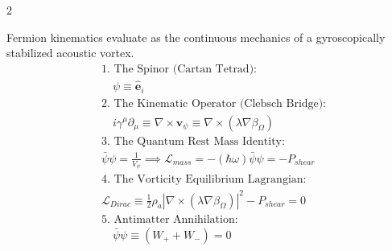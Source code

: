 \begin{multicols}{2}
\begin{tcolorbox}[cheatbox, title={\refstepcounter{cheatnum}\label{box:dirac_isomorphism}\thecheatnum. Vorticity Equilibrium (Dirac Isomorphism) \scriptsize\hfill\hyperref[sec:deriv_dirac_isomorphism]{[Proof $\downarrow$]}}]
Fermion kinematics evaluate as the continuous mechanics of a gyroscopically stabilized acoustic vortex.
\begin{align}
    &\text{1. The Spinor (Cartan Tetrad):} \nonumber \\
    &\quad \psi \equiv \mathbf{\hat{e}}_i \label{eq:spinor_identity} \\
    &\text{2. The Kinematic Operator (Clebsch Bridge):} \nonumber \\
    &\quad i\gamma^\mu \partial_\mu \equiv \nabla \times \mathbf{v}_\psi \equiv \nabla \times (\lambda \nabla \beta_\Omega) \label{eq:gamma_curl} \\
    &\text{3. The Quantum Rest Mass Identity:} \nonumber \\
    &\bar{\psi} \psi = \frac{1}{V_{\psi}} \implies \mathcal{L}_{mass} = - (\hbar \omega) \bar{\psi}\psi = - P_{shear} \label{eq:Quantum_mass_lagrangian} \\
    &\text{4. The Vorticity Equilibrium Lagrangian:} \nonumber \\
    &\mathcal{L}_{Dirac} \equiv \frac{1}{2}\rho_a |\nabla \times (\lambda \nabla \beta_\Omega)|^2 - P_{shear} = 0 \label{eq:dirac_fluid_lagrangian} \\
    &\text{5. Antimatter Annihilation:} \nonumber \\
    &\quad \bar{\psi}\psi \equiv (W_+ + W_-) = 0 \label{eq:chiral_annihilate} 
\end{align}
\end{tcolorbox}


\end{multicols}
